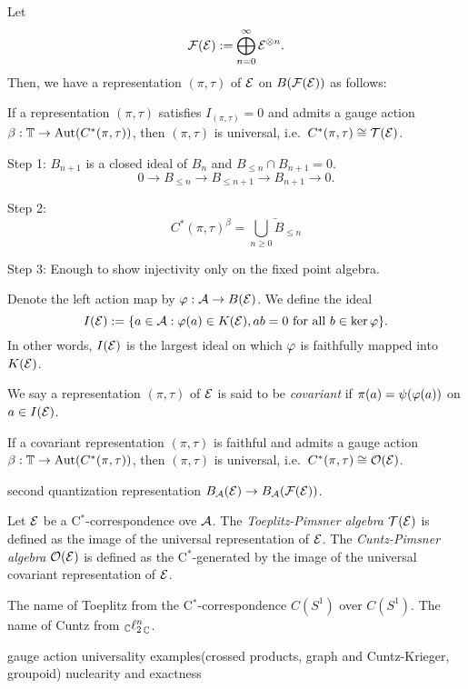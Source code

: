 \documentclass{../../small}
\begin{document}
\begin{defn}
Let
\[\mathcal{F}(\mathcal{E}):=\bigoplus_{n=0}^\infty\mathcal{E}^{\otimes n}.\]
Then, we have a representation $(\pi,\tau)$ of $\mathcal{E}$ on $B(\mathcal{F}(\mathcal{E}))$ as follows:
\end{defn}


\begin{thm}
If a representation $(\pi,\tau)$ satisfies $I_{(\pi,\tau)}=0$ and admits a gauge action $\beta:\mathbb{T}\to\operatorname{Aut}(C^*(\pi,\tau))$, then $(\pi,\tau)$ is universal, i.e.~$C^*(\pi,\tau)\cong\mathcal{T}(\mathcal{E})$.
\end{thm}
\begin{pf}[Sketch]
Step 1: $B_{n+1}$ is a closed ideal of $B_n$ and $B_{\le n}\cap B_{n+1}=0$.
\[0\to B_{\le n}\to B_{\le n+1}\to B_{n+1}\to0.\]

Step 2:
\[C^*(\pi,\tau)^\beta=\bar{\bigcup_{n\ge0} B_{\le n}}\]

Step 3: Enough to show injectivity only on the fixed point algebra.
\end{pf}






\bigskip

Denote the left action map by $\varphi:\mathcal{A}\to B(\mathcal{E})$.
We define the ideal
\[I(\mathcal{E}):=\{a\in\mathcal{A}:\varphi(a)\in K(\mathcal{E}), ab=0\text{ for all }b\in\ker\varphi\}.\]
In other words, $I(\mathcal{E})$ is the largest ideal on which $\varphi$ is faithfully mapped into $K(\mathcal{E})$.

\begin{defn}
We say a representation $(\pi,\tau)$ of $\mathcal{E}$ is said to be \emph{covariant} if $\pi(a)=\psi(\varphi(a))$ on $a\in I(\mathcal{E})$.
\end{defn}
\begin{thm}
If a covariant representation $(\pi,\tau)$ is faithful and admits a gauge action $\beta:\mathbb{T}\to\operatorname{Aut}(C^*(\pi,\tau))$, then $(\pi,\tau)$ is universal, i.e.~$C^*(\pi,\tau)\cong\mathcal{O}(\mathcal{E})$.
\end{thm}

second quantization representation $B_{\mathcal{A}}(\mathcal{E})\to B_{\mathcal{A}}(\mathcal{F}(\mathcal{E}))$.

\begin{defn}
Let $\mathcal{E}$ be a C$^*$-correspondence ove $\mathcal{A}$.
The \emph{Toeplitz-Pimsner algebra} $\mathcal{T}(\mathcal{E})$ is defined as the image of the universal representation of $\mathcal{E}$.
The \emph{Cuntz-Pimsner algebra} $\mathcal{O}(\mathcal{E})$ is defined as the C$^*$-generated by the image of the universal covariant representation of $\mathcal{E}$.
\end{defn}

The name of Toeplitz from the C$^*$-correspondence $C(S^1)$ over $C(S^1)$.
The name of Cuntz from $_{\mathbb{C}}{\ell_2^n}_{\mathbb{C}}$.



gauge action
universality
examples(crossed products, graph and Cuntz-Krieger, groupoid)
nuclearity and exactness
\end{document}
